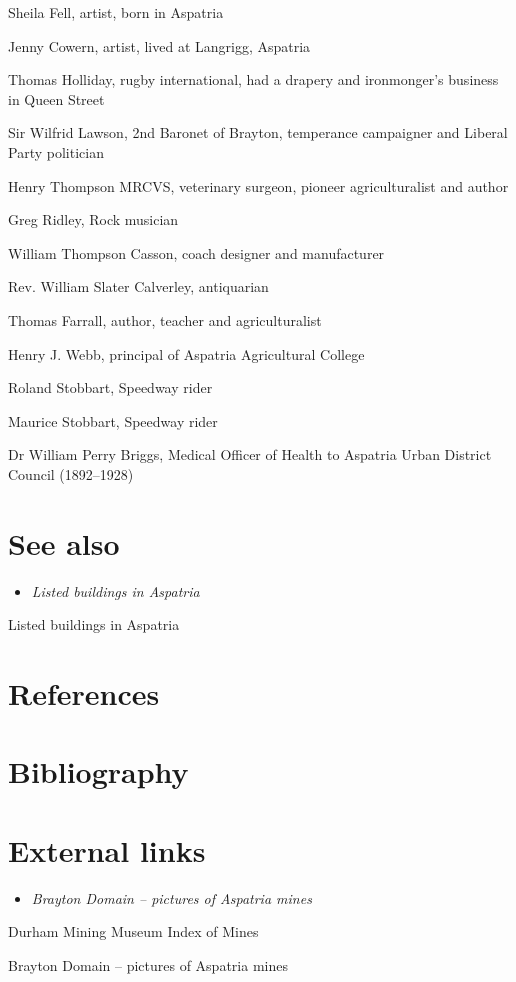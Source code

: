 Sheila Fell, artist, born in Aspatria

Jenny Cowern, artist, lived at Langrigg, Aspatria

Thomas Holliday, rugby international, had a drapery and ironmonger's
business in Queen Street

Sir Wilfrid Lawson, 2nd Baronet of Brayton, temperance campaigner and
Liberal Party politician

Henry Thompson MRCVS, veterinary surgeon, pioneer agriculturalist and
author

Greg Ridley, Rock musician

William Thompson Casson, coach designer and manufacturer

Rev. William Slater Calverley, antiquarian

Thomas Farrall, author, teacher and agriculturalist

Henry J. Webb, principal of Aspatria Agricultural College

Roland Stobbart, Speedway rider

Maurice Stobbart, Speedway rider

Dr William Perry Briggs, Medical Officer of Health to Aspatria Urban
District Council (1892--1928)

\section{See also}\label{see-also}

\begin{itemize}
\item
  \emph{Listed buildings in Aspatria}
\end{itemize}

Listed buildings in Aspatria

\section{References}\label{references}

\section{Bibliography}\label{bibliography}

\section{External links}\label{external-links}

\begin{itemize}
\item
  \emph{Brayton Domain -- pictures of Aspatria mines}
\end{itemize}

Durham Mining Museum Index of Mines

Brayton Domain -- pictures of Aspatria mines
